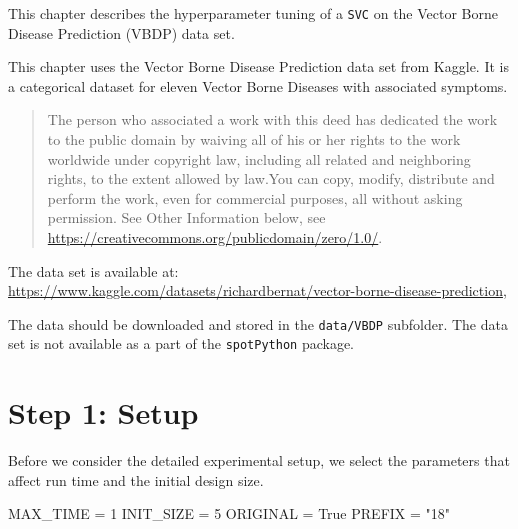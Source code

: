\documentclass[
  letterpaper,
  DIV=11,
  numbers=noendperiod]{scrreprt}
\newenvironment{Shaded}{\begin{snugshade}}{\end{snugshade}}
\newcommand{\DecValTok}[1]{\textcolor[rgb]{0.68,0.00,0.00}{#1}}
\newcommand{\NormalTok}[1]{\textcolor[rgb]{0.00,0.23,0.31}{#1}}
\newcommand{\OperatorTok}[1]{\textcolor[rgb]{0.37,0.37,0.37}{#1}}
\newcommand{\StringTok}[1]{\textcolor[rgb]{0.13,0.47,0.30}{#1}}
\newcommand{\VariableTok}[1]{\textcolor[rgb]{0.07,0.07,0.07}{#1}}
\begin{document}
This chapter describes the hyperparameter tuning of a \texttt{SVC} on
the Vector Borne Disease Prediction (VBDP) data set.

\begin{tcolorbox}[enhanced jigsaw, left=2mm, toprule=.15mm, colframe=quarto-callout-important-color-frame, leftrule=.75mm, title=\textcolor{quarto-callout-important-color}{\faExclamation}\hspace{0.5em}{Vector Borne Disease Prediction Data Set}, toptitle=1mm, opacitybacktitle=0.6, arc=.35mm, titlerule=0mm, opacityback=0, bottomtitle=1mm, coltitle=black, rightrule=.15mm, colback=white, colbacktitle=quarto-callout-important-color!10!white, breakable, bottomrule=.15mm]

This chapter uses the Vector Borne Disease Prediction data set from
Kaggle. It is a categorical dataset for eleven Vector Borne Diseases
with associated symptoms.

\begin{quote}
The person who associated a work with this deed has dedicated the work
to the public domain by waiving all of his or her rights to the work
worldwide under copyright law, including all related and neighboring
rights, to the extent allowed by law.You can copy, modify, distribute
and perform the work, even for commercial purposes, all without asking
permission. See Other Information below, see
\url{https://creativecommons.org/publicdomain/zero/1.0/}.
\end{quote}

The data set is available at:
\url{https://www.kaggle.com/datasets/richardbernat/vector-borne-disease-prediction},

The data should be downloaded and stored in the \texttt{data/VBDP}
subfolder. The data set is not available as a part of the
\texttt{spotPython} package.

\end{tcolorbox}

\hypertarget{sec-setup-18}{%
\section{Step 1: Setup}\label{sec-setup-18}}

Before we consider the detailed experimental setup, we select the
parameters that affect run time and the initial design size.

\begin{Shaded}
\begin{Highlighting}[]
\NormalTok{MAX\_TIME }\OperatorTok{=} \DecValTok{1}
\NormalTok{INIT\_SIZE }\OperatorTok{=} \DecValTok{5}
\NormalTok{ORIGINAL }\OperatorTok{=} \VariableTok{True}
\NormalTok{PREFIX }\OperatorTok{=} \StringTok{"18"}
\end{Highlighting}
\end{Shaded}
\end{document}
